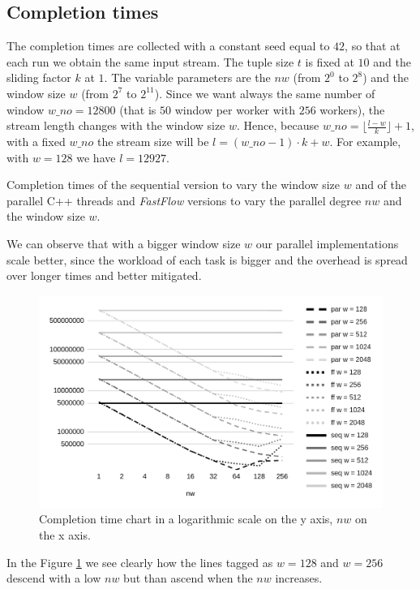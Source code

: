 \subsection{Completion times}
The completion times are collected with a constant seed equal to $42$, so that at each run we obtain the same input stream. The tuple size $t$ is fixed at $10$ and the sliding factor $k$ at $1$. The variable parameters are the $nw$ (from $2^0$ to $2^8$) and the window size $w$ (from $2^7$ to $2^{11}$). Since we want always the same number of window $w\_no = 12800$ (that is $50$ window per worker with $256$ workers), the stream length changes with the window size $w$. Hence, because $w\_no = \lfloor\frac{l-w}{k}\rfloor+1$, with a fixed $w\_no$ the stream size will be $l = (w\_no - 1) \cdot k + w$. For example, with $w = 128$ we have $l = 12927$.

\begin{table}[H]
    \centering
    
    \caption{Completion times of the sequential version to vary the window size $w$ and of the parallel C++ threads and \textit{FastFlow} versions to vary the parallel degree $nw$ and the window size $w$.}
    \label{tab:time_table}
\end{table}

\noindent
We can observe that with a bigger window size $w$ our parallel implementations scale better, since the workload of each task is bigger and the overhead is spread over longer times and better mitigated.

\begin{figure}[H]
    \centering
    \includegraphics[width=.75\linewidth]{assets/completion_time}
    \caption{Completion time chart in a logarithmic scale on the y axis, $nw$ on the x axis.}
    \label{fig:completion_time}
\end{figure}

\noindent
In the Figure \ref{fig:completion_time} we see clearly how the lines tagged as $w = 128$ and $w = 256$ descend with a low $nw$ but than ascend when the $nw$ increases.

